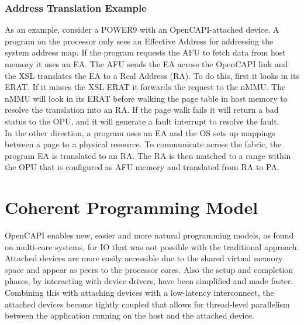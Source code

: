 


\subsubsection{Address Translation Example}
As an example, consider a POWER9 with an OpenCAPI-attached device. A program on the processor only sees an Effective Address for addressing the system address map. If the program requests the AFU to fetch data from host memory it uses an EA. The AFU sends the EA across the OpenCAPI link and the XSL translates the EA to a Real Address (RA). To do this, first it looks in its ERAT. If it misses the XSL ERAT it forwards the request to the nMMU. The nMMU will look in its ERAT before walking the page table in host memory to resolve the translation into an RA. If the page walk fails it will return a bad status to the OPU, and it will generate a fault interrupt to resolve the fault.\\
In the other direction, a program uses an EA and the OS sets up mappings between a page to a physical resource. To communicate across the fabric, the program EA is translated to an RA. The RA is then matched to a range within the OPU that is configured as AFU memory and translated from RA to PA.



\section{Coherent Programming Model}

OpenCAPI enables new, easier and more natural programming models, as found on multi-core systems, for IO that was not possible with the traditional approach. Attached devices are more easily accessible due to the shared virtual memory space and appear as peers to the processor cores. Also the setup and completion phases, by interacting with device drivers, have been simplified and made faster. Combining this with attaching devices with a low-latency interconnect, the attached devices become tightly coupled that allows for thread-level parallelism between the application running on the host and the attached device.



